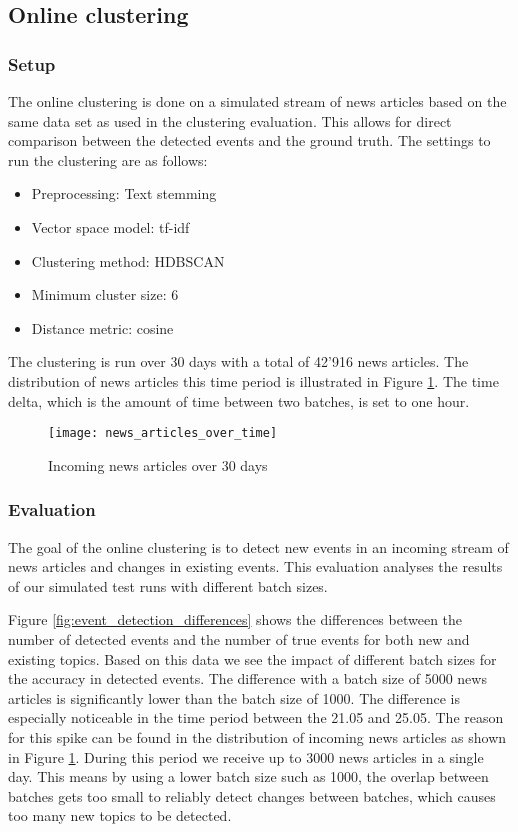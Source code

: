 \subsection{Online clustering}

\subsubsection{Setup}

The online clustering is done on a simulated stream of news articles based on the same data set as used in the clustering evaluation. This allows for direct comparison between the detected events and the ground truth. The settings to run the clustering are as follows:

\begin{itemize}
    \item Preprocessing: Text stemming
    \item Vector space model: tf-idf
    \item Clustering method: HDBSCAN
    \item Minimum cluster size: 6
    \item Distance metric: cosine
\end{itemize}

The clustering is run over 30 days with a total of 42'916 news articles. The distribution of news articles this time period is illustrated in Figure \ref{fig:news_articles_over_time}. The time delta, which is the amount of time between two batches, is set to one hour. 

\begin{figure}[h]
    \centering
    \texttt{[image: news\_articles\_over\_time]}
    \caption{Incoming news articles over 30 days}
    \label{fig:news_articles_over_time}
\end{figure}

\subsubsection{Evaluation}

The goal of the online clustering is to detect new events in an incoming stream of news articles and changes in existing events. This evaluation analyses the results of our simulated test runs with different batch sizes.

Figure \ref{fig:event_detection_differences} shows the differences between the number of detected events and the number of true events for both new and existing topics. Based on this data we see the impact of different batch sizes for the accuracy in detected events. The difference with a batch size of 5000 news articles is significantly lower than the batch size of 1000. The difference is especially noticeable in the time period between the 21.05 and 25.05. The reason for this spike can be found in the distribution of incoming news articles as shown in Figure \ref{fig:news_articles_over_time}. During this period we receive up to 3000 news articles in a single day. This means by using a lower batch size such as 1000, the overlap between batches gets too small to reliably detect changes between batches, which causes too many new topics to be detected. 

